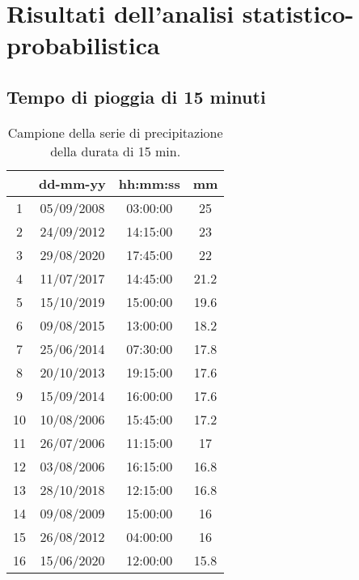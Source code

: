 \section{Risultati dell'analisi statistico-probabilistica}
\subsection{Tempo di pioggia di 15 minuti}

\begin{table}[H] \centering
    \caption{Campione della serie di precipitazione della durata di 15 min.}
    \begin{tabular}{cccc}
        \toprule    
       & dd-mm-yy   & hh:mm:ss & mm \\
       \midrule
    1  & 05/09/2008 & 03:00:00 & 25   \\
    2  & 24/09/2012 & 14:15:00 & 23   \\
    3  & 29/08/2020 & 17:45:00 & 22   \\
    4  & 11/07/2017 & 14:45:00 & 21.2 \\
    5  & 15/10/2019 & 15:00:00 & 19.6 \\
    6  & 09/08/2015 & 13:00:00 & 18.2 \\
    7  & 25/06/2014 & 07:30:00 & 17.8 \\
    8  & 20/10/2013 & 19:15:00 & 17.6 \\
    9  & 15/09/2014 & 16:00:00 & 17.6 \\
    10 & 10/08/2006 & 15:45:00 & 17.2 \\
    11 & 26/07/2006 & 11:15:00 & 17   \\
    12 & 03/08/2006 & 16:15:00 & 16.8 \\
    13 & 28/10/2018 & 12:15:00 & 16.8 \\
    14 & 09/08/2009 & 15:00:00 & 16   \\
    15 & 26/08/2012 & 04:00:00 & 16   \\
    16 & 15/06/2020 & 12:00:00 & 15.8 \\
    \bottomrule
    \end{tabular}
    \end{table}
